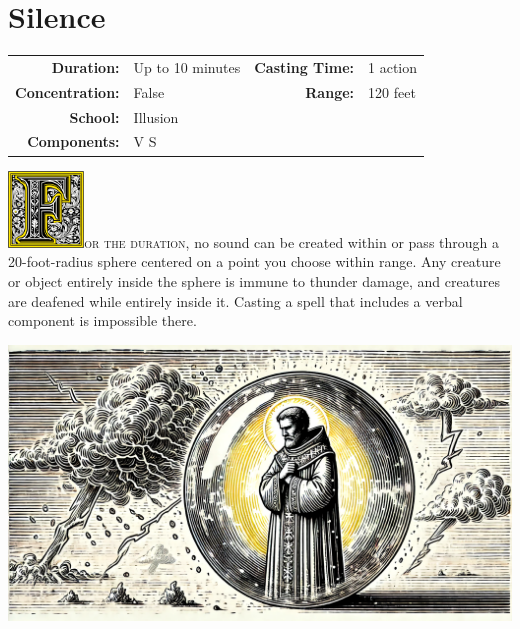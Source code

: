 \documentclass[12pt,showtrims]{memoir}
\begin{document}
\section*{Silence}
{
\small\centering\vspace{-6pt}
\begin{tabular}{rlrl}
\toprule

\textbf{Duration:} & Up to 10 minutes &
\textbf{Casting Time:} & 1 action \\
\textbf{Concentration:} & False &
\textbf{Range:} &  120 feet\\
\textbf{School:} & Illusion \\
\textbf{Components:} & \multicolumn{3}{p{0.7\textwidth}}{V S}\\

\bottomrule
\end{tabular}
}
\vspace{1\baselineskip}\noindent 
\lettrine[lines=4]{\includegraphics[height=58pt]{initials/F.png}}{or the duration}, no sound can be created within or pass through a 20-foot-radius sphere centered on a point you choose within range. Any creature or object entirely inside the sphere is immune to thunder damage, and creatures are deafened while entirely inside it. Casting a spell that includes a verbal component is impossible there.

\vfill\vfill
\noindent
\includegraphics[width=\textwidth]{spell_artwork/silence.png}
\vfill
\end{document}
